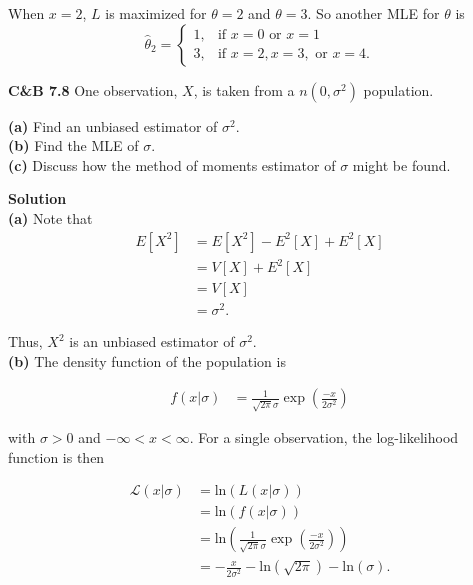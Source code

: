 \documentclass{article}
\newcommand{\mybox}{%
    \collectbox{%
        \setlength{\fboxsep}{1pt}%
        \fbox{\BOXCONTENT}%
    }%
}
\begin{document}
\noindent When $x= 2$, $L$ is maximized for $\theta = 2$ and $\theta = 3$.  So another MLE for $\theta$ is 
$$\hat{\theta}_2 = 
\begin{cases}
1, & \text{if } x=0 \text{ or } x=1 \\
3, & \text{if } x=2, x = 3, \text{ or } x = 4.
\end{cases}
$$

\pagebreak

\noindent\mybox{\textbf{C\&B 7.8}}  One observation, $X$, is taken from a $n(0,\sigma^2)$ population.
\begin{flushleft}
\textbf{(a)} Find an unbiased estimator of $\sigma^2$.\\
\textbf{(b)} Find the MLE of $\sigma$.\\
\textbf{(c)} Discuss how the method of moments estimator of $\sigma$ might be found.
\end{flushleft}

\vspace{5mm}

\noindent\mybox{\textbf{Solution}}\\
\textbf{(a)} Note that 
\begin{align}
E[X^2] &= E[X^2] - E^2[X] + E^2[X] \\
&= V[X] + E^2[X] \\
&= V[X] \\
&= \sigma^2.
\end{align}

\noindent Thus, $X^2$ is an unbiased estimator of $\sigma^2$.  
\\

\noindent\textbf{(b)} The density function of the population is 

\begin{align}
f(x|\sigma) &= \frac{1}{\sqrt{2\pi}\sigma}\exp\left(\frac{-x}{2\sigma^2}\right)
\end{align}

\noindent with $\sigma > 0$ and $-\infty < x < \infty$.  For a single observation, the log-likelihood function is then 

\begin{align}
\mathscr{L}(x|\sigma) &= \text{ln}\left(L(x|\sigma)\right) \\
&= \text{ln}\left(f(x|\sigma)\right) \\
&= \text{ln}\left(\frac{1}{\sqrt{2\pi}\sigma}\exp\left(\frac{-x}{2\sigma^2}\right)\right) \\
&= -\frac{x}{2\sigma^2}-\text{ln}\left(\sqrt{2\pi}\right) - \text{ln}(\sigma).
\end{align}
\end{document}
